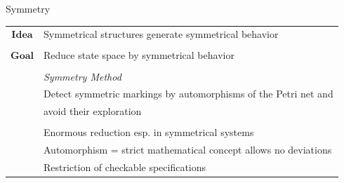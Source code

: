 \documentclass[11pt]{presentation}
\begin{document}
\begin{frame}{Symmetry}
	\begin{tabular}{c p{12cm}}
		$ \textbf{Idea} $ & Symmetrical structures generate symmetrical behavior                           \\
		                  &                                                                                \\
		$ \textbf{Goal} $ & Reduce state space by symmetrical behavior                                     \\
		                  &                                                                                \\
		\bfrightarrow     & \emph{Symmetry Method} \cite{starke_reachability_1991} \cite{schmidt_how_2000} \\
		                  & {\small Detect symmetric markings by automorphisms of the Petri net and }      \\
		                  & {\small avoid their exploration}                                               \\
		                  &                                                                                \\
		\bfplus           & Enormous reduction esp. in symmetrical systems                                 \\
		\bfminus          & Automorphism = strict mathematical concept allows no deviations                \\
		                  & Restriction of checkable specifications                                        \\
	\end{tabular}
\end{frame}

\end{document}

